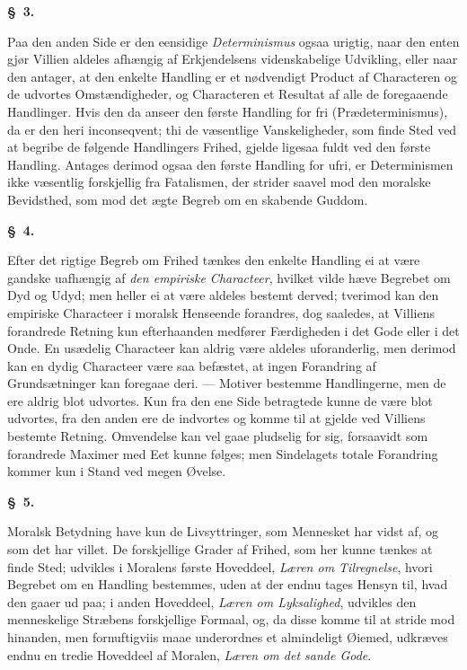 \documentclass[12pt]{article}
\newcommand{\opage}[1]{\marginnote{\footnotesize\textit{[#1]}}}
\newcommand{\slaw}[1]{\par\medskip\begin{center}\textbf{\S~#1.}\end{center}\nopagebreak}
\begin{document}
\slaw{3}
Paa den anden Side er den eensidige \emph{Determinismus} ogsaa urigtig, naar den enten gjør Villien aldeles afhængig af Erkjendelsens videnskabelige Udvikling, eller naar den antager, at den enkelte Handling er et nødvendigt Product af Characteren og de udvortes Omstændigheder, og Characteren et Resultat af alle de foregaaende Handlinger. Hvis den da anseer den første Handling for fri (Prædeterminismus), da er den heri inconseqvent; thi de væsentlige Vanskeligheder, som finde Sted ved at begribe de følgende Handlingers Frihed, gjelde ligesaa fuldt ved den første Handling. Antages derimod ogsaa den første Handling for ufri, \opage{143}er Determinismen ikke væsentlig forskjellig fra Fatalismen, der strider saavel mod den moralske Bevidsthed, som mod det ægte Begreb om en skabende Guddom.

\slaw{4}
Efter det rigtige Begreb om Frihed tænkes den enkelte Handling ei at være gandske uafhængig af \emph{den empiriske Characteer}, hvilket vilde hæve Begrebet om Dyd og Udyd; men heller ei at være aldeles bestemt derved; tverimod kan den empiriske Characteer i moralsk Henseende forandres, dog saaledes, at Villiens forandrede Retning kun efterhaanden medfører Færdigheden i det Gode eller i det Onde. En usædelig Characteer kan aldrig være aldeles uforanderlig, men derimod kan en dydig Characteer være saa befæstet, at ingen Forandring af Grundsætninger kan foregaae deri. --- Motiver bestemme Handlingerne, men de ere aldrig blot udvortes. Kun fra den ene Side betragtede kunne de være blot udvortes, fra den anden ere de indvortes og komme til at gjelde ved Villiens bestemte Retning. Omvendelse kan vel gaae pludselig for sig, forsaavidt som forandrede Maximer med Eet kunne følges; men Sindelagets totale Forandring kommer kun i Stand ved megen Øvelse.

\slaw{5}
Moralsk Betydning have kun de Livsyttringer, som Mennesket har vidst af, og som det har villet. De forskjellige Grader af Frihed, som her kunne tænkes at finde Sted; udvikles i Moralens første Hoveddeel, \emph{Læren om Tilregnelse}, hvori Begrebet om en Handling bestemmes, uden at der endnu tages Hensyn til, hvad den gaaer ud paa; i anden Hoveddeel, \emph{Læren om Lyksalighed}, udvikles den menneskelige Stræbens forskjellige Formaal, og, da disse komme til at stride mod hinanden, men fornuftigviis maae underordnes et almindeligt Øiemed, udkræves endnu en tredie Hoveddeel af Moralen, \emph{Læren om det sande Gode}.
\end{document}

